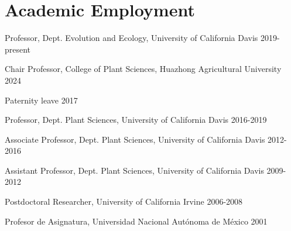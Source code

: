 \documentclass[letterpaper,10pt]{article}
\renewenvironment{itemize}{
  \begin{list}{}{
    \setlength{\leftmargin}{1.5em}
  }
}{
  \end{list}
}
\begin{document}
\section*{Academic Employment}
\begin{itemize}
\setlength\itemsep{0ex}
\item Professor, Dept. Evolution and Ecology, University of California Davis 2019-present
\item Chair Professor, College of Plant Sciences, Huazhong Agricultural University 2024
\item Paternity leave 2017
\item Professor, Dept. Plant Sciences, University of California Davis 2016-2019
\item Associate Professor, Dept. Plant Sciences, University of California Davis 2012-2016
\item Assistant Professor, Dept. Plant Sciences, University of California Davis 2009-2012
\item Postdoctoral Researcher, University of California Irvine 2006-2008
\item Profesor de Asignatura, Universidad Nacional Aut\'{o}noma de M\'{e}xico 2001
\end{itemize}

\end{document}
